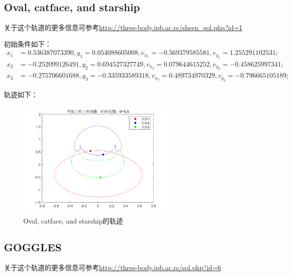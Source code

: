 \documentclass{article}
\begin{document}
\subsection{Oval, catface, and starship}
\par
关于这个轨道的更多信息可参考\url{http://three-body.ipb.ac.rs/sheen_sol.php?id=1}
\par 初始条件如下：
\begin{align*}
	x_1&= 0.536387073390 ,y_1= 0.054088605008,v_{x_1}= -0.569379585581, v_{y_1}= 1.255291102531;\\
	x_2&= -0.252099126491 ,y_2= 0.694527327749,	v_{x_2}= 0.079644615252 ,v_{y_2}= -0.458625997341;\\
	x_3&= -0.275706601688 ,y_3=-0.335933589318,v_{x_3}= 0.489734970329, v_{y_3}= -0.796665105189;
\end{align*}
\par 轨迹如下：
\begin{figure}[H]
	\centering  %
	\includegraphics[width=0.7\textwidth]{一些优美的周期解//Oval, catface, and starship}
	\caption{Oval, catface, and starship的轨迹}
	\label{OCS}
\end{figure}

\subsection{GOGGLES}
\par
关于这个轨道的更多信息可参考\url{http://three-body.ipb.ac.rs/sol.php?id=6}
\end{document}
